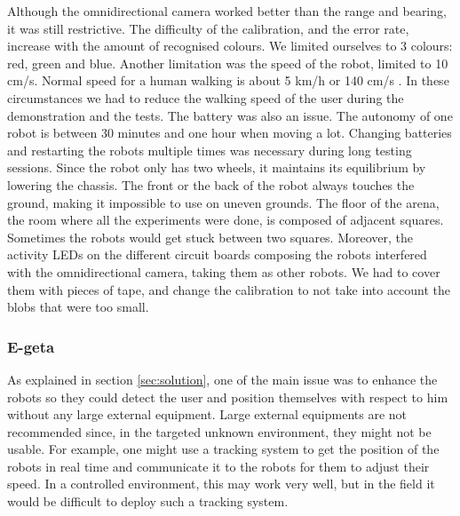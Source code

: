 \documentclass[oneside, a4paper, 12pt]{memoir}
\begin{document}
		Although the omnidirectional camera worked better than the range and bearing, it was still restrictive. The difficulty of the calibration, and the error rate, increase with the amount of recognised colours. We limited ourselves to 3 colours: red, green and blue. Another limitation was the speed of the robot, limited to 10 cm/s. Normal speed for a human walking is about 5 km/h or 140 cm/s \citep{wiki:002}. In these circumstances we had to reduce the walking speed of the user during the demonstration and the tests. The battery was also an issue. The autonomy of one robot is between 30 minutes and one hour when moving a lot. Changing batteries and restarting the robots multiple times was necessary during long testing sessions. Since the robot only has two wheels, it maintains its equilibrium by lowering the chassis. The front or the back of the robot always touches the ground, making it impossible to use on uneven grounds. The floor of the arena, the room where all the experiments were done, is composed of adjacent squares. Sometimes the robots would get stuck between two squares. Moreover, the activity LEDs on the different circuit boards composing the robots interfered with the omnidirectional camera, taking them as other robots. We had to cover them with pieces of tape, and change the calibration to not take into account the blobs that were too small.
		
		\subsubsection{E-geta} %

		
	As explained in section \ref{sec:solution}, one of the main issue was to enhance the robots so they could detect the user and position themselves with respect to him without any large external equipment. Large external equipments are not recommended since, in the targeted unknown environment, they might not be usable. For example, one might use a tracking system to get the position of the robots in real time and communicate it to the robots for them to adjust their speed. In a controlled environment, this may work very well, but in the field it would be difficult to deploy such a tracking system.
	
\end{document}
